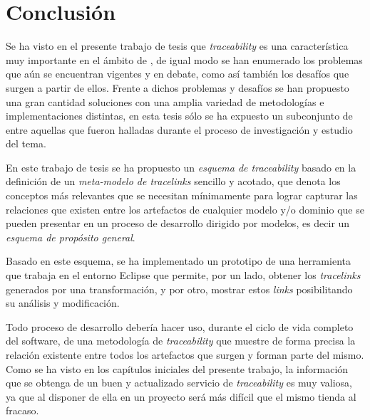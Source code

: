 \documentclass[a4paper,12pt,twoside,spanish,openright]{book}
\begin{document}
\backmatter

\lhead[]{}
\rhead[]{}

\chapter{Conclusión}

Se ha visto en el presente trabajo de tesis que \textit{traceability} es una característica muy importante en el ámbito de , de igual modo se han enumerado los problemas que aún se encuentran vigentes y en debate, como así también los desafíos que surgen a partir de ellos. Frente a dichos problemas y desafíos se han propuesto una gran cantidad soluciones con una amplia variedad de metodologías e implementaciones distintas, en esta tesis sólo se ha expuesto un subconjunto de entre aquellas que fueron halladas durante el proceso de investigación y estudio del tema.

En este trabajo de tesis se ha propuesto un \textit{esquema de traceability} basado en la definición de un \textit{meta-modelo de tracelinks} sencillo y acotado, que denota los conceptos más relevantes que se necesitan mínimamente para lograr capturar las relaciones que existen entre los artefactos de cualquier modelo y/o dominio que se pueden presentar en un proceso de desarrollo dirigido por modelos, es decir un \textit{esquema de propósito general}.

Basado en este esquema, se ha implementado un prototipo de una herramienta que trabaja en el entorno \textsf{Eclipse} que permite, por un lado, obtener los \textit{tracelinks} generados por una transformación, y por otro, mostrar estos \textit{links} posibilitando su análisis y modificación.

Todo proceso de desarrollo debería hacer uso, durante el ciclo de vida completo del software, de una metodología de \textit{traceability} que muestre de forma precisa la relación existente entre todos los artefactos que surgen y forman parte del mismo. Como se ha visto en los capítulos iniciales del presente trabajo, la información que se obtenga de un buen y actualizado servicio de \textit{traceability} es muy valiosa, ya que al disponer de ella en un proyecto será más difícil que el mismo tienda al fracaso.

\cleardoublepage


\end{document}
